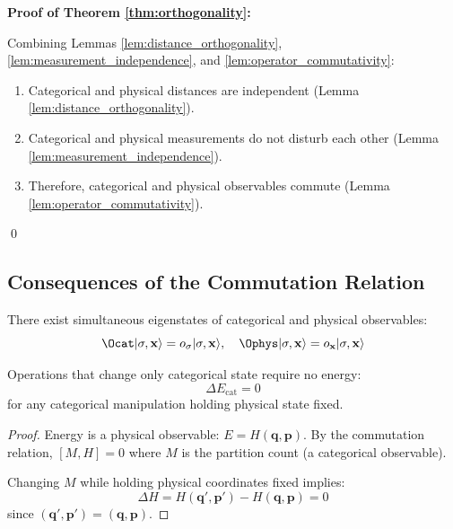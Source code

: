 \textbf{Proof of Theorem \ref{thm:orthogonality}:}

Combining Lemmas \ref{lem:distance_orthogonality}, \ref{lem:measurement_independence}, and \ref{lem:operator_commutativity}:
\begin{enumerate}
    \item Categorical and physical distances are independent (Lemma \ref{lem:distance_orthogonality}).
    \item Categorical and physical measurements do not disturb each other (Lemma \ref{lem:measurement_independence}).
    \item Therefore, categorical and physical observables commute (Lemma \ref{lem:operator_commutativity}).
\end{enumerate}
\qed

\subsection{Consequences of the Commutation Relation}

\begin{corollary}
\label{cor:simultaneous}
There exist simultaneous eigenstates of categorical and physical observables:
\begin{equation}
\Ocat |\sigma, \mathbf{x}\rangle = o_{\sigma} |\sigma, \mathbf{x}\rangle, \quad \Ophys |\sigma, \mathbf{x}\rangle = o_{\mathbf{x}} |\sigma, \mathbf{x}\rangle
\end{equation}
\end{corollary}

\begin{corollary}
\label{cor:zero_energy}
Operations that change only categorical state require no energy:
\begin{equation}
\Delta E_{\text{cat}} = 0
\end{equation}
for any categorical manipulation holding physical state fixed.
\end{corollary}

\begin{proof}
Energy is a physical observable: $E = H(\mathbf{q}, \mathbf{p})$. By the commutation relation, $[M, H] = 0$ where $M$ is the partition count (a categorical observable).

Changing $M$ while holding physical coordinates fixed implies:
\begin{equation}
\Delta H = H(\mathbf{q}', \mathbf{p}') - H(\mathbf{q}, \mathbf{p}) = 0
\end{equation}
since $(\mathbf{q}', \mathbf{p}') = (\mathbf{q}, \mathbf{p})$.
\end{proof}

